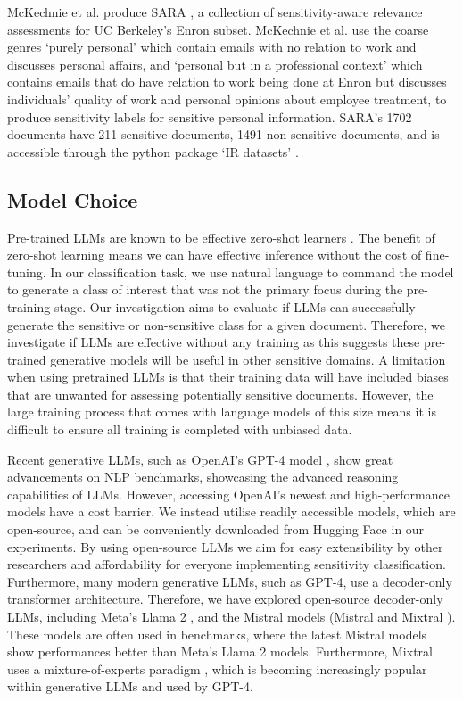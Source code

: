 McKechnie et al. produce SARA \cite{mckechnie2024sara}, a collection of sensitivity-aware relevance assessments for UC Berkeley’s Enron subset. McKechnie et al. use the coarse genres `purely personal' which contain emails with no relation to work and discusses personal affairs, and `personal but in a professional context' which contains emails that do have relation to work being done at Enron but discusses individuals' quality of work and personal opinions about employee treatment, to produce sensitivity labels for sensitive personal information. SARA’s 1702 documents have 211 sensitive documents, 1491 non-sensitive documents, and is accessible through the python package `IR datasets' \cite{macavaney2021simplified}.

\subsection{Model Choice}
\label{sec:approach:ModelChoice}
Pre-trained LLMs are known to be effective zero-shot learners \cite{kojima2022large}. The benefit of zero-shot learning means we can have effective inference without the cost of fine-tuning. In our classification task, we use natural language to command the model to generate a class of interest that was not the primary focus during the pre-training stage. Our investigation aims to evaluate if LLMs can successfully generate the sensitive or non-sensitive class for a given document. Therefore, we investigate if LLMs are effective without any training as this suggests these pre-trained generative models will be useful in other sensitive domains. A limitation when using pretrained LLMs is that their training data will have included biases that are unwanted for assessing potentially sensitive documents. However, the large training process that comes with language models of this size means it is difficult to ensure all training is completed with unbiased data.

Recent generative LLMs, such as OpenAI’s GPT-4 model \cite{openai2023gpt}, show great advancements on NLP benchmarks, showcasing the advanced reasoning capabilities of LLMs. However, accessing OpenAI’s newest and high-performance models have a cost barrier. We instead utilise readily accessible models, which are open-source, and can be conveniently downloaded from Hugging Face \cite{wolf-etal-2020-transformers} in our experiments. By using open-source LLMs we aim for easy extensibility by other researchers and affordability for everyone implementing sensitivity classification. Furthermore, many modern generative LLMs, such as GPT-4, use a decoder-only transformer architecture. Therefore, we have explored open-source decoder-only LLMs, including Meta’s Llama 2 \cite{touvron2023llama}, and the Mistral models (Mistral \cite{jiang2023mistral} and Mixtral \cite{jiang2024mixtral}). These models are often used in benchmarks, where the latest Mistral models show performances better than Meta’s Llama 2 models. Furthermore, Mixtral uses a mixture-of-experts paradigm \cite{jacobs1991adaptive, shazeer2017outrageously}, which is becoming increasingly popular within generative LLMs and used by GPT-4.

